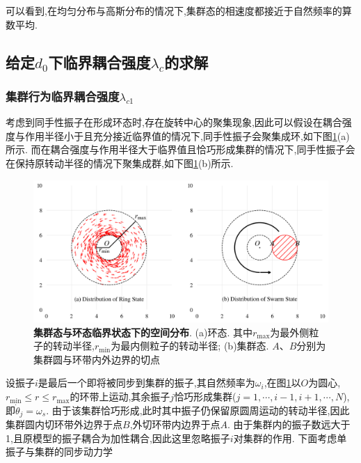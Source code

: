 \documentclass{article}
\begin{document}
\vspace{-0.5cm}

可以看到,在均匀分布与高斯分布的情况下,集群态的相速度都接近于自然频率的算数平均.

\subsection{给定$d_0$下临界耦合强度$\lambda_c$的求解}
\subsubsection{集群行为临界耦合强度$\lambda_{c1}$}

考虑到同手性振子在形成环态时,存在旋转中心的聚集现象,因此可以假设在耦合强度与作用半径小于且充分接近临界值的情况下,同手性振子会聚集成环,如下图\ref{fig:fig23.1}(a)所示. 而在耦合强度与作用半径大于临界值且恰巧形成集群的情况下,同手性振子会在保持原转动半径的情况下聚集成群,如下图\ref{fig:fig23.1}(b)所示.

\begin{figure}[H]
	\centering
	\includegraphics[width=\textwidth]{./figs/circleSwarmEdges1.png}
	\vspace{-1cm}
	\caption{\small \textbf{集群态与环态临界状态下的空间分布}. (a)环态. 其中$r_{\max}$为最外侧粒子的转动半径,$r_{\min}$为最内侧粒子的转动半径; (b)集群态. $A$、$B$分别为集群圆与环带内外边界的切点}
	\label{fig:fig23.1}
\end{figure}

设振子$i$是最后一个即将被同步到集群的振子,其自然频率为$\omega _i$,在图\ref{fig:fig23.1}以$O$为圆心,$r_{\min}\leqslant r\leqslant r_{\max}$的环带上运动,其余振子$j$恰巧形成集群($j=1,\cdots ,i-1,i+1,\cdots ,N$),即$\dot{\theta}_j=\omega_s$. 由于该集群恰巧形成,此时其中振子仍保留原圆周运动的转动半径,因此集群圆内切环带外边界于点$B$,外切环带内边界于点$A$. 由于集群内的振子数远大于1,且原模型的振子耦合为加性耦合,因此这里忽略振子$i$对集群的作用. 下面考虑单振子与集群的同步动力学
\end{document}

